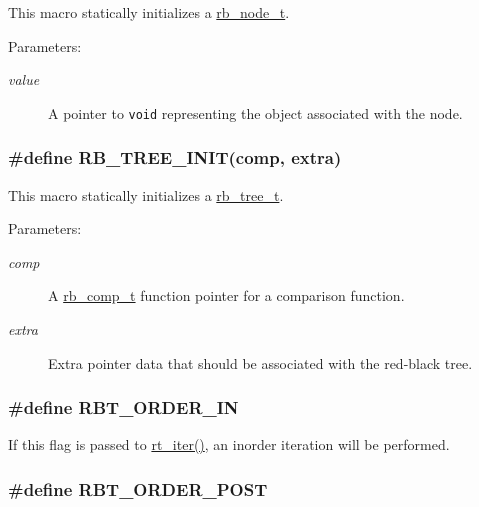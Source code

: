 This macro statically initializes a \hyperlink{group__dbprim__rbtree_a1}{rb\_\-node\_\-t}.

\begin{Desc}
\item[Parameters:]
\begin{description}
\item[{\em value}]A pointer to {\tt void} representing the object associated with the node. \end{description}
\end{Desc}
\hypertarget{group__dbprim__rbtree_a14}{
\subsubsection[RB\_\-TREE\_\-INIT]{\setlength{\rightskip}{0pt plus 5cm}\#define RB\_\-TREE\_\-INIT(comp, extra)}}
\label{group__dbprim__rbtree_a14}


This macro statically initializes a \hyperlink{group__dbprim__rbtree_a0}{rb\_\-tree\_\-t}.

\begin{Desc}
\item[Parameters:]
\begin{description}
\item[{\em comp}]A \hyperlink{group__dbprim__rbtree_a3}{rb\_\-comp\_\-t} function pointer for a comparison function. \item[{\em extra}]Extra pointer data that should be associated with the red-black tree. \end{description}
\end{Desc}
\hypertarget{group__dbprim__rbtree_a22}{
\subsubsection[RBT\_\-ORDER\_\-IN]{\setlength{\rightskip}{0pt plus 5cm}\#define RBT\_\-ORDER\_\-IN}}
\label{group__dbprim__rbtree_a22}


If this flag is passed to \hyperlink{group__dbprim__rbtree_a11}{rt\_\-iter()}, an inorder iteration will be performed. \hypertarget{group__dbprim__rbtree_a23}{
\subsubsection[RBT\_\-ORDER\_\-POST]{\setlength{\rightskip}{0pt plus 5cm}\#define RBT\_\-ORDER\_\-POST}}
\label{group__dbprim__rbtree_a23}


